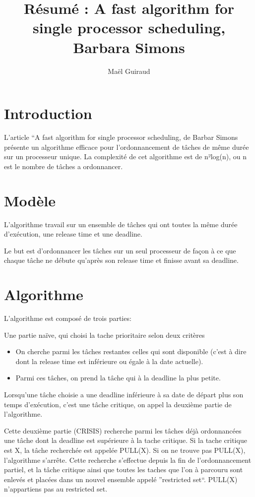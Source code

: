 \documentclass{article}
\title{Résumé : A fast algorithm for single processor scheduling, Barbara Simons }
\author{Maël Guiraud}
\begin{document}
\maketitle
\parindent=0pt
\section*{Introduction}
L'article ``A fast algorithm for single processor scheduling, de Barbar Simons présente un algorithme efficace pour l’ordonnancement de tâches de même durée
sur un processeur unique. La complexité de cet algorithme est de n²log(n), ou n est le nombre de tâches a ordonnancer.
\section{Modèle}

L'algorithme travail sur un ensemble de tâches qui ont toutes la même durée d’exécution, une release time et une deadline.

Le but est d'ordonnancer les tâches sur un seul processeur de façon à ce que chaque tâche ne débute qu'après son release time et finisse avant sa deadline.

\section{Algorithme}
L'algorithme est composé de trois parties:
 
Une partie naïve, qui choisi la tache prioritaire selon deux critères
\begin{itemize}
 \item On cherche parmi les tâches restantes celles qui sont disponible (c'est à dire dont la release time est inférieure ou égale à la date actuelle).
 \item Parmi ces tâches, on prend la tâche qui à la deadline la plus petite.
\end{itemize}
Lorsqu'une tâche choisie a une deadline inférieure à sa date de départ plus son temps d’exécution, c'est une tâche critique,
on appel la deuxième partie de l'algorithme.

Cette deuxième partie (CRISIS) recherche parmi les tâches déjà ordonnancées une tâche dont la deadline est supérieure à la tache critique.
Si la tache critique est X, la tâche recherchée est appelée PULL(X). Si on ne trouve pas PULL(X), l'algorithme s'arrête.
Cette recherche s'effectue depuis la fin de l'ordonnancement partiel, et la tâche critique ainsi que toutes les taches que l'on à parcouru sont enlevés et placées dans un 
nouvel ensemble appelé ''restricted set``. PULL(X) n'appartiens pas au restricted set.
\end{document}
